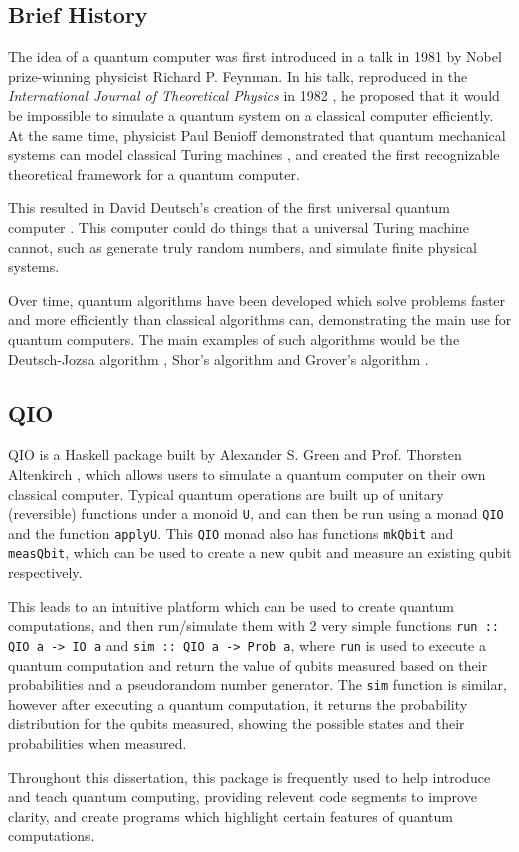 \documentclass[a4paper,10pt, titlepage, twoside]{article}
\begin{document}
\subsection{Brief History}
The idea of a quantum computer was first introduced in a talk in 1981 by Nobel prize-winning physicist Richard P. Feynman. In his talk, reproduced in the \textit{International Journal of Theoretical Physics} in 1982 \cite{feynman}, he proposed that it would be impossible to simulate a quantum system on a classical computer efficiently. At the same time, physicist Paul Benioff demonstrated that quantum mechanical systems can model classical Turing machines \cite{benioff}, and created the first recognizable theoretical framework for a quantum computer. \par
This resulted in David Deutsch's creation of the first universal quantum computer \cite{deutsch}. This computer could do things that a universal Turing machine cannot, such as generate truly random numbers, and simulate finite physical systems. \par
Over time, quantum algorithms have been developed which solve problems faster and more efficiently than classical algorithms can, demonstrating the main use for quantum computers. The main examples of such algorithms would be the Deutsch-Jozsa algorithm  \cite{deutsch-jozsa}, Shor's algorithm \cite{shor} and Grover's algorithm \cite{grover}.

\subsection{QIO}
QIO is a Haskell package built by Alexander S. Green and Prof. Thorsten Altenkirch \cite{qio}, which allows users to simulate a quantum computer on their own classical computer. Typical quantum operations are built up of unitary (reversible) functions under a monoid \texttt{U}, and can then be run using a monad \texttt{QIO} and the function \texttt{applyU}. This \texttt{QIO} monad also has functions \texttt{mkQbit} and \texttt{measQbit}, which can be used to create a new qubit and measure an existing qubit respectively.\par
This leads to an intuitive platform which can be used to create quantum computations, and then run/simulate them with 2 very simple functions \texttt{run :: QIO a -> IO a}  and \texttt{sim :: QIO a -> Prob a}, where \texttt{run} is used to execute a quantum computation and return the value of qubits measured based on their probabilities and a pseudorandom number generator. The \texttt{sim} function is similar, however after executing a quantum computation, it returns the probability distribution for the qubits measured, showing the possible states and their probabilities when measured.\par
Throughout this dissertation, this package is frequently used to help introduce and teach quantum computing, providing relevent code segments to improve clarity, and create programs which highlight certain features of quantum computations.
\end{document}
